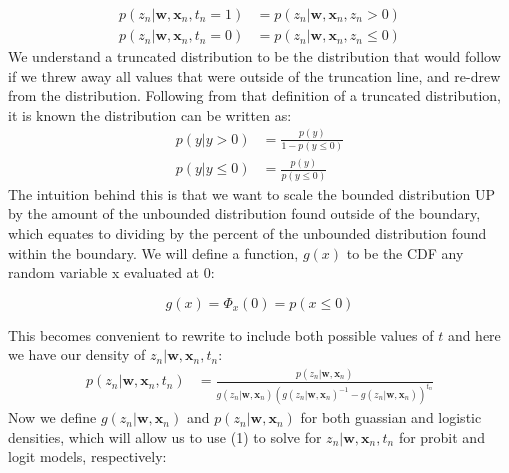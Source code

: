 \documentclass[a4paper,12pt]{article}
\begin{document}
\begin{align*}
p(z_n | \bm{w}, \bm{x}_n, t_n = 1) &= p(z_n | \bm{w}, \bm{x}_n, z_n > 0) \\
p(z_n | \bm{w}, \bm{x}_n, t_n = 0) &= p(z_n | \bm{w}, \bm{x}_n, z_n \leq 0)
\end{align*}
%
We understand a truncated distribution to be the distribution that would follow if we threw away all values that were outside of the truncation line, and re-drew from the distribution. Following from that definition of a truncated distribution, it is known the distribution can be written as:
%
\begin{align*}
p(y | y > 0) &= \frac{p(y)}{1 - p(y \leq 0)} \\
p(y | y \leq 0) &= \frac{p(y)}{p(y \leq 0)}
\end{align*}
%
The intuition behind this is that we want to scale the bounded distribution UP by the amount of the unbounded distribution found outside of the boundary, which equates to dividing by the percent of the unbounded distribution found within the boundary. We will define a function, $g(x)$ to be the CDF any random variable x evaluated at 0:

$$
g(x) = \Phi_x(0) = p(x \leq 0)
$$

This becomes convenient to rewrite to include both possible values of $t$ and here we have our density of $z_n | \bm{w}, \bm{x}_n, t_n$:
%
\begin{align}
p(z_n | \bm{w}, \bm{x}_n, t_n) &= \frac{p(z_n | \bm{w}, \bm{x}_n)}{g(z_n | \bm{w}, \bm{x}_n)(g(z_n| \bm{w}, \bm{x}_n)^{-1} - g(z_n | \bm{w}, \bm{x}_n))^{t_n}}
\end{align}
%
Now we define $g(z_n | \bm{w}, \bm{x}_n)$ and $p(z_n | \bm{w}, \bm{x}_n)$ for both guassian and logistic densities, which will allow us to use (1) to solve for $z_n | \bm{w}, \bm{x}_n, t_n$ for probit and logit models, respectively:
\end{document}
